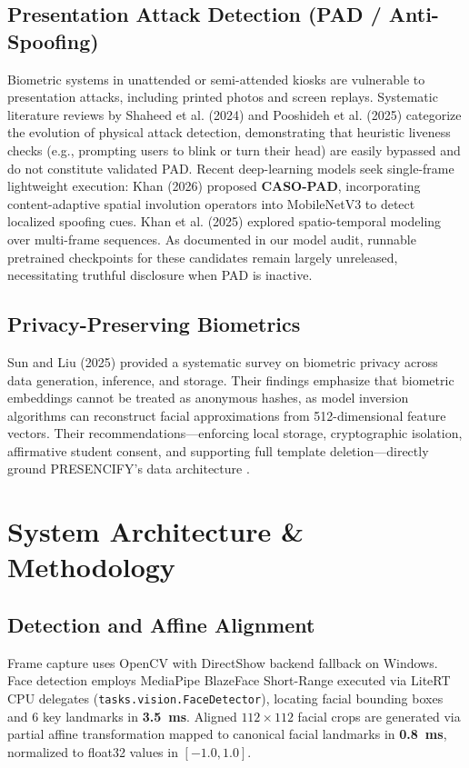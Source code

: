 \documentclass[conference]{IEEEtran}
\begin{document}
\subsection{Presentation Attack Detection (PAD / Anti-Spoofing)}
Biometric systems in unattended or semi-attended kiosks are vulnerable to presentation attacks, including printed photos and screen replays. Systematic literature reviews by Shaheed et al. (2024) \cite{shaheed2024deep} and Pooshideh et al. (2025) \cite{pooshideh2025pad} categorize the evolution of physical attack detection, demonstrating that heuristic liveness checks (e.g., prompting users to blink or turn their head) are easily bypassed and do not constitute validated PAD. Recent deep-learning models seek single-frame lightweight execution: Khan (2026) \cite{khan2026casopad} proposed \textbf{CASO-PAD}, incorporating content-adaptive spatial involution operators into MobileNetV3 to detect localized spoofing cues. Khan et al. (2025) \cite{khan2025spatiotemporal} explored spatio-temporal modeling over multi-frame sequences. As documented in our model audit, runnable pretrained checkpoints for these candidates remain largely unreleased, necessitating truthful disclosure when PAD is inactive.

\subsection{Privacy-Preserving Biometrics}
Sun and Liu (2025) \cite{sun2025privacy} provided a systematic survey on biometric privacy across data generation, inference, and storage. Their findings emphasize that biometric embeddings cannot be treated as anonymous hashes, as model inversion algorithms can reconstruct facial approximations from 512-dimensional feature vectors. Their recommendations---enforcing local storage, cryptographic isolation, affirmative student consent, and supporting full template deletion---directly ground PRESENCIFY's data architecture \cite{zhou2024privacy, chen2025leakages}.

\section{System Architecture \& Methodology}

\subsection{Detection and Affine Alignment}
Frame capture uses OpenCV with DirectShow backend fallback on Windows. Face detection employs MediaPipe BlazeFace Short-Range executed via LiteRT CPU delegates (\texttt{tasks.vision.FaceDetector}), locating facial bounding boxes and 6 key landmarks in \textbf{3.5~ms}. Aligned $112\times 112$ facial crops are generated via partial affine transformation mapped to canonical facial landmarks in \textbf{0.8~ms}, normalized to float32 values in $[-1.0, 1.0]$.
\end{document}

